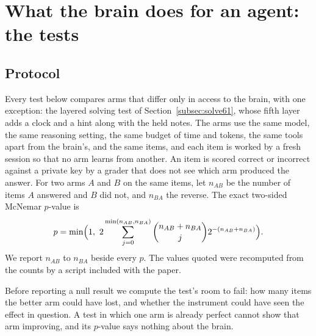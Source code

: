 \section{What the brain does for an agent: the tests}\label{sec:tests}

\subsection{Protocol}
Every test below compares arms that differ only in access to the brain, with one exception: the layered solving test of Section~\ref{subsec:solve61}, whose fifth layer adds a clock and a hint along with the held notes. The arms use the same model, the same reasoning setting, the same budget of time and tokens, the same tools apart from the brain's, and the same items, and each item is worked by a fresh session so that no arm learns from another. An item is scored correct or incorrect against a private key by a grader that does not see which arm produced the answer. For two arms $A$ and $B$ on the same items, let $n_{AB}$ be the number of items $A$ answered and $B$ did not, and $n_{BA}$ the reverse. The exact two-sided McNemar $p$-value is
\[
p=\min\Bigl(1,\ 2\sum_{j=0}^{\min(n_{AB},n_{BA})}\binom{n_{AB}+n_{BA}}{j}2^{-(n_{AB}+n_{BA})}\Bigr).
\]
We report $n_{AB}$ to $n_{BA}$ beside every $p$. The values quoted were recomputed from the counts by a script included with the paper.

Before reporting a null result we compute the test's room to fail: how many items the better arm could have lost, and whether the instrument could have seen the effect in question. A test in which one arm is already perfect cannot show that arm improving, and its $p$-value says nothing about the brain.

